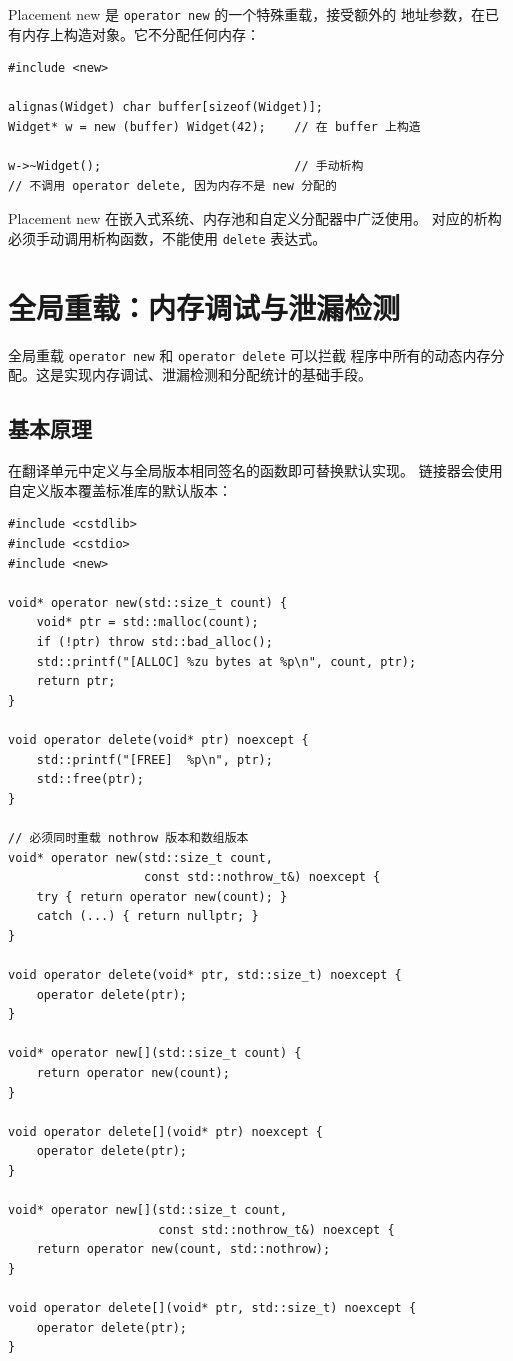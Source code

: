 \documentclass[12pt,a4paper,fontset=fandol]{ctexbook}
\begin{document}
Placement new 是 \texttt{operator new} 的一个特殊重载，接受额外的
地址参数，在已有内存上构造对象。它不分配任何内存：

\begin{lstlisting}
#include <new>

alignas(Widget) char buffer[sizeof(Widget)];
Widget* w = new (buffer) Widget(42);    // 在 buffer 上构造

w->~Widget();                           // 手动析构
// 不调用 operator delete, 因为内存不是 new 分配的
\end{lstlisting}

Placement new 在嵌入式系统、内存池和自定义分配器中广泛使用。
对应的析构必须手动调用析构函数，不能使用 \texttt{delete} 表达式。

\chapter{全局重载：内存调试与泄漏检测}

全局重载 \texttt{operator new} 和 \texttt{operator delete} 可以拦截
程序中所有的动态内存分配。这是实现内存调试、泄漏检测和分配统计的基础手段。

\section{基本原理}

在翻译单元中定义与全局版本相同签名的函数即可替换默认实现。
链接器会使用自定义版本覆盖标准库的默认版本：

\begin{lstlisting}
#include <cstdlib>
#include <cstdio>
#include <new>

void* operator new(std::size_t count) {
    void* ptr = std::malloc(count);
    if (!ptr) throw std::bad_alloc();
    std::printf("[ALLOC] %zu bytes at %p\n", count, ptr);
    return ptr;
}

void operator delete(void* ptr) noexcept {
    std::printf("[FREE]  %p\n", ptr);
    std::free(ptr);
}

// 必须同时重载 nothrow 版本和数组版本
void* operator new(std::size_t count,
                   const std::nothrow_t&) noexcept {
    try { return operator new(count); }
    catch (...) { return nullptr; }
}

void operator delete(void* ptr, std::size_t) noexcept {
    operator delete(ptr);
}

void* operator new[](std::size_t count) {
    return operator new(count);
}

void operator delete[](void* ptr) noexcept {
    operator delete(ptr);
}

void* operator new[](std::size_t count,
                     const std::nothrow_t&) noexcept {
    return operator new(count, std::nothrow);
}

void operator delete[](void* ptr, std::size_t) noexcept {
    operator delete(ptr);
}
\end{lstlisting}
\end{document}
